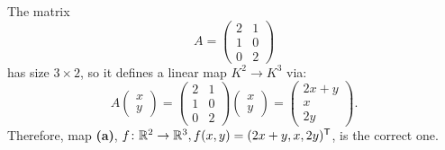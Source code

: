 \begin{exercisesolution*}
\label{sol:matrix_map_mc}
The matrix
\[
A = \begin{pmatrix} 2 & 1 \\ 1 & 0 \\ 0 & 2 \end{pmatrix}
\]
has size $3 \times 2$, so it defines a linear map $K^2 \to K^3$ via:
\[
A \begin{pmatrix} x \\ y \end{pmatrix} = \begin{pmatrix} 2 & 1 \\ 1 & 0 \\ 0 & 2 \end{pmatrix} \begin{pmatrix} x \\ y \end{pmatrix} = \begin{pmatrix} 2x + y \\ x \\ 2y \end{pmatrix}.
\]
Therefore, map \textbf{(a)}, $f \colon \mathbb{R}^2 \to \mathbb{R}^3, f(x, y) = (2x + y, x, 2y)^{\mathsf{T}}$, is the correct one.
\end{exercisesolution*}

